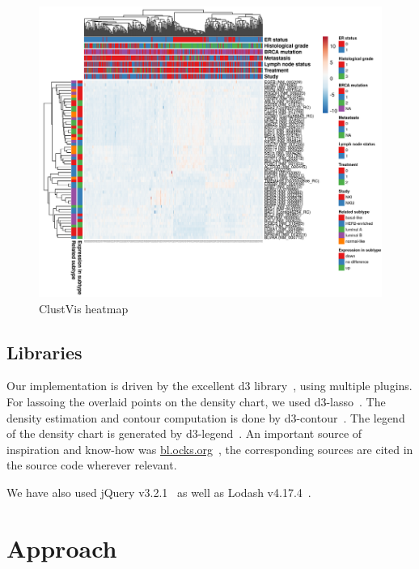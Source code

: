 \documentclass{vgtc} %
\begin{document}
\begin{figure}[bt]
    \centering
    \includegraphics[width=\columnwidth]{clustvis-heat}
    \caption{ClustVis heatmap}
    \label{fig:clustvis-heatmap}
\end{figure}

\subsection{Libraries}

Our implementation is driven by the excellent d3 library~\cite{d3}, using
multiple plugins. For lassoing the overlaid points on the density chart, we
used d3-lasso~\cite{d3-lasso}. The density estimation and contour computation
is done by d3-contour~\cite{d3-contour}. The legend of the density chart is
generated by d3-legend~\cite{d3-legend}. An important source of inspiration and
know-how was \url{bl.ocks.org}~\cite{blocks}, the corresponding sources are
cited in the source code wherever relevant.

We have also used jQuery v3.2.1~\cite{jquery} as well as Lodash
v4.17.4~\cite{lodash}.

\vfill

\section{Approach} %
\end{document}
